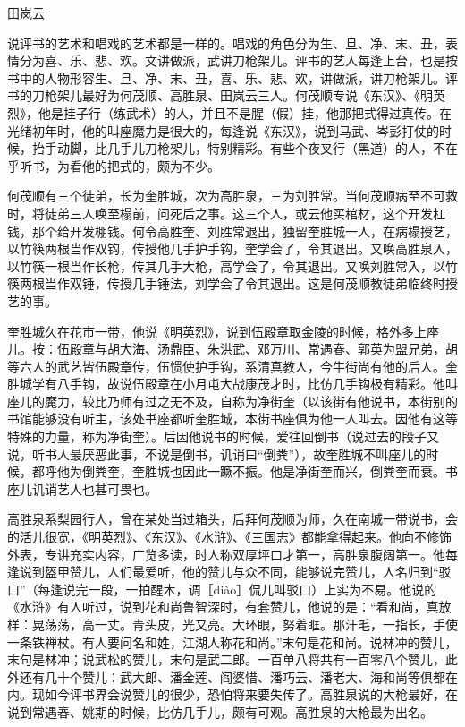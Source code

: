 \documentclass[12pt,UTF8]{ctexbook}
\begin{document}
田岚云


说评书的艺术和唱戏的艺术都是一样的。唱戏的角色分为生、旦、净、末、丑，表情分为喜、乐、悲、欢。文讲做派，武讲刀枪架儿。评书的艺人每逢上台，也是按书中的人物形容生、旦、净、末、丑，喜、乐、悲、欢，讲做派，讲刀枪架儿。评书的刀枪架儿最好为何茂顺、高胜泉、田岚云三人。何茂顺专说《东汉》、《明英烈》，他是挂子行（练武术）的人，并且不是腥（假）挂，他那把式得过真传。在光绪初年时，他的叫座魔力是很大的，每逢说《东汉》，说到马武、岑彭打仗的时候，抬手动脚，比几手儿刀枪架儿，特别精彩。有些个夜叉行（黑道）的人，不在乎听书，为看他的把式的，颇为不少。

何茂顺有三个徒弟，长为奎胜城，次为高胜泉，三为刘胜常。当何茂顺病至不可救时，将徒弟三人唤至榻前，问死后之事。这三个人，或云他买棺材，这个开发杠钱，那个给开发棚钱。何令高胜奎、刘胜常退出，独留奎胜城一人，在病榻授艺，以竹筷两根当作双钩，传授他几手护手钩，奎学会了，令其退出。又唤高胜泉入，以竹筷一根当作长枪，传其几手大枪，高学会了，令其退出。又唤刘胜常入，以竹筷两根当作双锤，传授几手锤法，刘学会了令其退出。这是何茂顺教徒弟临终时授艺的事。

奎胜城久在花市一带，他说《明英烈》，说到伍殿章取金陵的时候，格外多上座儿。按：伍殿章与胡大海、汤鼎臣、朱洪武、邓万川、常遇春、郭英为盟兄弟，胡等六人的武艺皆伍殿章传，伍惯使护手钩，系清真教人，今牛街尚有他的后人。奎胜城学有八手钩，故说伍殿章在小月屯大战康茂才时，比仿几手钩极有精彩。他叫座儿的魔力，较比乃师有过之无不及，自称为净街奎（以该街有他说书，本街别的书馆能够没有听主，该处书座都听奎胜城，本街书座俱为他一人叫去。因他有这等特殊的力量，称为净街奎）。后因他说书的时候，爱往回倒书（说过去的段子又说，听书人最厌恶此事，不说是倒书，讥诮曰“倒粪”），故奎胜城不叫座儿的时候，都呼他为倒粪奎，奎胜城也因此一蹶不振。他是净街奎而兴，倒粪奎而衰。书座儿讥诮艺人也甚可畏也。

高胜泉系梨园行人，曾在某处当过箱头，后拜何茂顺为师，久在南城一带说书，会的活儿很宽，《明英烈》、《东汉》、《水浒》、《三国志》都能拿得起来。他向不修饰外表，专讲充实内容，广览多读，时人称双厚坪口才第一，高胜泉腹阔第一。他每逢说到盔甲赞儿，人们最爱听，他的赞儿与众不同，能够说完赞儿，人名归到“驳口”（每逢说完一段，一拍醒木，调［diào］侃儿叫驳口）上实为不易。他说的《水浒》有人听过，说到花和尚鲁智深时，有套赞儿，他说的是：“看和尚，真放样：晃荡荡，高一丈。青头皮，光又亮。大环眼，努着眶。那汗毛，一指长，手使一条铁禅杖。有人要问名和姓，江湖人称花和尚。”末句是花和尚。说林冲的赞儿，末句是林冲；说武松的赞儿，末句是武二郎。一百单八将共有一百零八个赞儿，此外还有几十个赞儿：武大郎、潘金莲、阎婆惜、潘巧云、潘老大、海和尚等俱都在内。现如今评书界会说赞儿的很少，恐怕将来要失传了。高胜泉说的大枪最好，在说到常遇春、姚期的时候，比仿几手儿，颇有可观。高胜泉的大枪最为出名。
\end{document}
